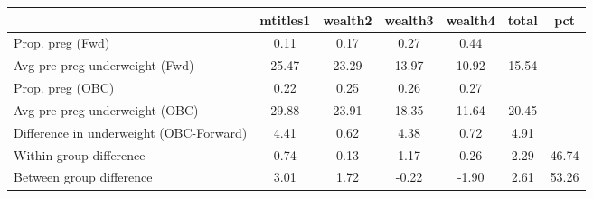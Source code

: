 \begin{tabular}{l*{6}{c}}
\toprule
            &\multicolumn{1}{c}{mtitles1}&\multicolumn{1}{c}{wealth2}&\multicolumn{1}{c}{wealth3}&\multicolumn{1}{c}{wealth4}&\multicolumn{1}{c}{total}&\multicolumn{1}{c}{pct}\\
\midrule
\midrule
Prop. preg (Fwd)&        0.11&        0.17&        0.27&        0.44&            &            \\
Avg pre-preg underweight (Fwd)&       25.47&       23.29&       13.97&       10.92&       15.54&            \\
Prop. preg (OBC)&        0.22&        0.25&        0.26&        0.27&            &            \\
Avg pre-preg underweight (OBC)&       29.88&       23.91&       18.35&       11.64&       20.45&            \\
Difference in underweight (OBC-Forward)&        4.41&        0.62&        4.38&        0.72&        4.91&            \\
Within group difference&        0.74&        0.13&        1.17&        0.26&        2.29&       46.74\\
Between group difference&        3.01&        1.72&       -0.22&       -1.90&        2.61&       53.26\\
\bottomrule
\end{tabular}

